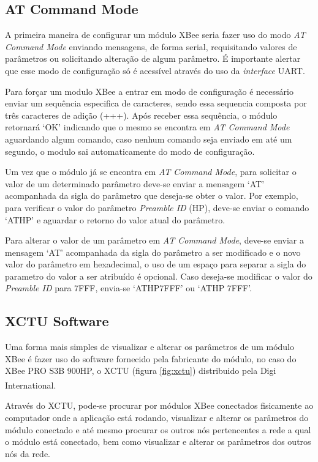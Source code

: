 \subsection{AT Command Mode}

A primeira maneira de configurar um módulo XBee seria fazer uso do modo \emph{AT Command Mode} enviando mensagens, de forma serial, requisitando valores de parâmetros ou solicitando alteração de algum parâmetro. É importante alertar que esse modo de configuração só é acessível através do uso da \emph{interface} UART.

Para forçar um modulo XBee a entrar em modo de configuração é necessário enviar um sequência especifica de caracteres, sendo essa sequencia composta por três caracteres de adição (+++). Após receber essa sequência, o módulo retornará `OK' indicando que o mesmo se encontra em \emph{AT Command Mode} aguardando algum comando, caso nenhum comando seja enviado em até um segundo, o modulo sai automaticamente do modo de configuração.

Um vez que o módulo já se encontra em \emph{AT Command Mode}, para solicitar o valor de um determinado parâmetro deve-se enviar a mensagem `AT' acompanhada da sigla do parâmetro que deseja-se obter o valor. Por exemplo, para verificar o valor do parâmetro \emph{Preamble ID} (HP), deve-se enviar o comando `ATHP' e aguardar o retorno do valor atual do parâmetro.

Para alterar o valor de um parâmetro em \emph{AT Command Mode}, deve-se enviar a mensagem `AT' acompanhada da sigla do parâmetro a ser modificado e o novo valor do parâmetro em hexadecimal, o uso de um espaço para separar a sigla do parametro do valor a ser atribuído é opcional. Caso deseja-se modificar o valor do \emph{Preamble ID} para 7FFF, envia-se `ATHP7FFF' ou `ATHP 7FFF'.

\subsection{XCTU Software}

Uma forma mais simples de visualizar e alterar os parâmetros de um módulo XBee é fazer uso do software fornecido pela fabricante do módulo, no caso do XBee PRO S3B 900HP, o XCTU (figura \ref{fig:xctu}) distribuido pela Digi International\textsuperscript{\texttrademark}.

Através do XCTU, pode-se procurar por módulos XBee conectados fisicamente ao computador onde a aplicação está rodando, visualizar e alterar os parâmetros do módulo conectado e até mesmo procurar os outros nós pertencentes a rede a qual o módulo está conectado, bem como visualizar e alterar os parâmetros dos outros nós da rede. 

